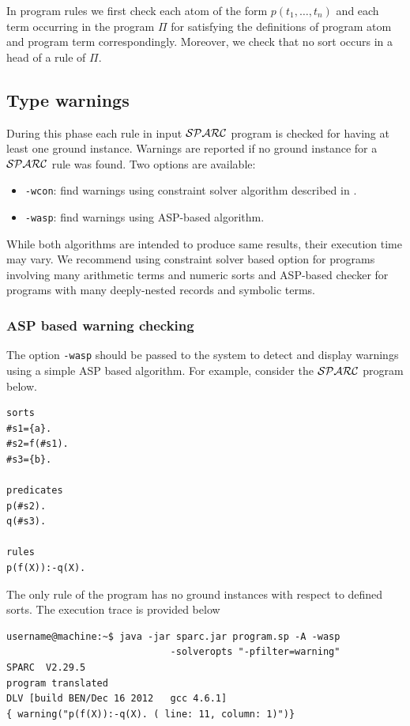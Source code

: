 \documentclass[12pt, letterpaper]{article}
\begin{document}
In program rules we first check each atom of the form $p(t_1,\dots,t_n)$ and each term occurring in the program $\Pi$ for satisfying
the definitions of program atom and program term correspondingly\cite{sparc}. Moreover, we check that no sort occurs in a head of a rule of $\Pi$.
\subsection{Type warnings}\label{type_warnings}
During this phase each rule in input ${\cal SPARC}$ program is checked for having at least one ground instance. Warnings are reported if no ground instance for a ${\cal SPARC}$ rule was found.  Two options are available:
\begin{itemize}
\item \texttt{-wcon}: find warnings using  constraint solver algorithm described in \cite{sparc}. 
\item \texttt{-wasp}: find warnings using ASP-based algorithm.
\end{itemize}

While both algorithms are intended to produce same results, their execution time may vary. We recommend using constraint solver based option for programs involving many arithmetic terms and numeric sorts and ASP-based checker for programs with many deeply-nested records and symbolic terms.     

\subsubsection{ASP based warning checking} \label{asp_type_warnings}
The option \texttt{-wasp} should be passed to the  system  to detect and display warnings using a simple ASP based algorithm.
For example, consider the ${\cal SPARC}$ program below.

\begin{verbatim}
sorts
#s1={a}.
#s2=f(#s1).
#s3={b}.

predicates
p(#s2).
q(#s3).

rules
p(f(X)):-q(X).
\end{verbatim}

The only rule of the program has no ground instances with respect to defined sorts.
The execution trace is provided below
\begin{verbatim}
username@machine:~$ java -jar sparc.jar program.sp -A -wasp
                             -solveropts "-pfilter=warning"
SPARC  V2.29.5
program translated
DLV [build BEN/Dec 16 2012   gcc 4.6.1]
{ warning("p(f(X)):-q(X). ( line: 11, column: 1)")}
\end{verbatim}
\end{document}
